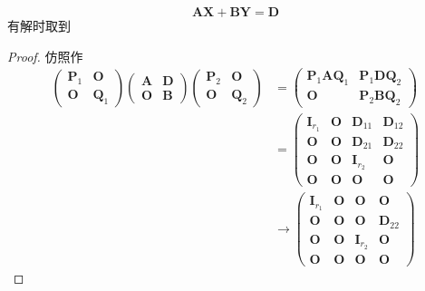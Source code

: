 {\begin{enumerate}[label=\arabic*）]
\[                  \bm{AX}+\bm{BY} = \bm{D}
              \]
              有解时取到\begin{proof}
                  仿照作
                  \begin{align*}
                      \begin{pmatrix}
                          \bm{P}_1 & \bm{O} \\\bm{O} & \bm{Q}_1
                      \end{pmatrix}
                      \begin{pmatrix}
                          \bm{A} & \bm{D} \\
                          \bm{O} & \bm{B}
                      \end{pmatrix}
                      \begin{pmatrix}
                          \bm{P}_2 & \bm{O} \\\bm{O} & \bm{Q}_2
                      \end{pmatrix}
                       & =\begin{pmatrix}
                              \bm{P}_1\bm{AQ}_1 & \bm{P}_1\bm{DQ}_2 \\
                              \bm{O}            & \bm{P}_2\bm{BQ}_2
                          \end{pmatrix}              \\
                       & =\begin{pmatrix}
                              \bm{I}_{r_1} & \bm{O} & \bm{D}_{11}  & \bm{D}_{12} \\
                              \bm{O}       & \bm{O} & \bm{D}_{21}  & \bm{D}_{22} \\
                              \bm{O}       & \bm{O} & \bm{I}_{r_2} & \bm{O}      \\
                              \bm{O}       & \bm{O} & \bm{O}       & \bm{O}
                          \end{pmatrix} \\
                       & \longrightarrow
                      \begin{pmatrix}
                          \bm{I}_{r_1} & \bm{O} & \bm{O}       & \bm{O}      \\
                          \bm{O}       & \bm{O} & \bm{O}       & \bm{D}_{22} \\
                          \bm{O}       & \bm{O} & \bm{I}_{r_2} & \bm{O}      \\
                          \bm{O}       & \bm{O} & \bm{O}       & \bm{O}

\end{pmatrix}
\end{align*}
\end{proof}
\end{enumerate}}
